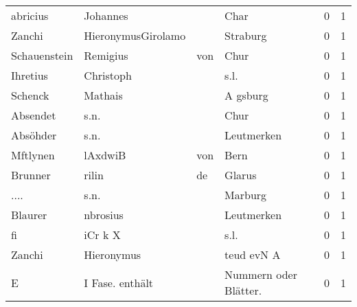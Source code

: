 \begin{center}
\begin{tiny}
\begin{longtabu}{llllrr}
                 abricius &                           Johannes &             &                                        Char &          0 &         1 \\
                   Zanchi &                 HieronymusGirolamo &             &                                    Straburg &          0 &         1 \\
             Schauenstein &                           Remigius &         von &                                        Chur &          0 &         1 \\
                 Ihretius &                          Christoph &             &                                        s.l. &          0 &         1 \\
                  Schenck &                            Mathais &             &                                    A gsburg &          0 &         1 \\
                 Absendet &                               s.n. &             &                                        Chur &          0 &         1 \\
                 Absöhder &                               s.n. &             &                                  Leutmerken &          0 &         1 \\
                 Mftlynen &                            lAxdwiB &         von &                                        Bern &          0 &         1 \\
                  Brunner &                              rilin &          de &                                      Glarus &          0 &         1 \\
                     .... &                               s.n. &             &                                     Marburg &          0 &         1 \\
                  Blaurer &                           nbrosius &             &                                  Leutmerken &          0 &         1 \\
                       fi &                            iCr k X &             &                                        s.l. &          0 &         1 \\
                   Zanchi &                         Hieronymus &             &                                  teud evN A &          0 &         1 \\
                        E &                    I Fase. enthält &             &                      Nummern oder Blätter.  &          0 &         1 \\

\end{longtabu}
\end{tiny}
\end{center}
